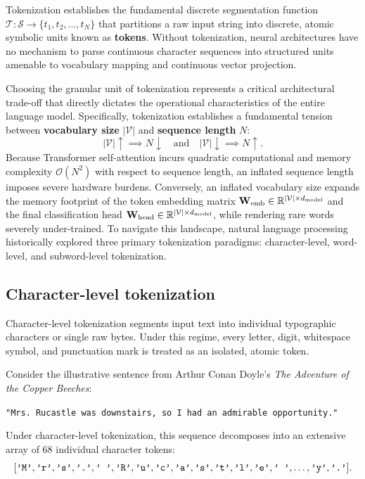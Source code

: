\documentclass[../../../main.tex]{subfiles}
\begin{document}
Tokenization establishes the fundamental discrete segmentation function $\mathcal{T}: \mathcal{S} \to \{t_1, t_2, \dots, t_N\}$ that partitions a raw input string into discrete, atomic symbolic units known as \textbf{tokens}. Without tokenization, neural architectures have no mechanism to parse continuous character sequences into structured units amenable to vocabulary mapping and continuous vector projection.

Choosing the granular unit of tokenization represents a critical architectural trade-off that directly dictates the operational characteristics of the entire language model. Specifically, tokenization establishes a fundamental tension between \textbf{vocabulary size} $|\mathcal{V}|$ and \textbf{sequence length} $N$:
\begin{equation}
\label{eq:tokenization_tradeoff}
|\mathcal{V}| \uparrow \implies N \downarrow \quad \text{and} \quad |\mathcal{V}| \downarrow \implies N \uparrow.
\end{equation}
Because Transformer self-attention incurs quadratic computational and memory complexity $\mathcal{O}(N^2)$ with respect to sequence length, an inflated sequence length imposes severe hardware burdens. Conversely, an inflated vocabulary size expands the memory footprint of the token embedding matrix $\mathbf{W}_{\text{emb}} \in \mathbb{R}^{|\mathcal{V}| \times d_{\text{model}}}$ and the final classification head $\mathbf{W}_{\text{head}} \in \mathbb{R}^{|\mathcal{V}| \times d_{\text{model}}}$, while rendering rare words severely under-trained. To navigate this landscape, natural language processing historically explored three primary tokenization paradigms: character-level, word-level, and subword-level tokenization.

\subsection{Character-level tokenization}
\label{subsec:character_level_tokenization}

Character-level tokenization segments input text into individual typographic characters or single raw bytes. Under this regime, every letter, digit, whitespace symbol, and punctuation mark is treated as an isolated, atomic token.

Consider the illustrative sentence from Arthur Conan Doyle's \emph{The Adventure of the Copper Beeches}:
\begin{center}
\texttt{"Mrs. Rucastle was downstairs, so I had an admirable opportunity."}
\end{center}
Under character-level tokenization, this sequence decomposes into an extensive array of 68 individual character tokens:
\begin{equation}
\label{eq:char_token_example}
[\text{\texttt{'M'}}, \text{\texttt{'r'}}, \text{\texttt{'s'}}, \text{\texttt{'.'}}, \text{\texttt{' '}}, \text{\texttt{'R'}}, \text{\texttt{'u'}}, \text{\texttt{'c'}}, \text{\texttt{'a'}}, \text{\texttt{'s'}}, \text{\texttt{'t'}}, \text{\texttt{'l'}}, \text{\texttt{'e'}}, \text{\texttt{' '}}, \dots, \text{\texttt{'y'}}, \text{\texttt{'.'}}].
\end{equation}
\end{document}
